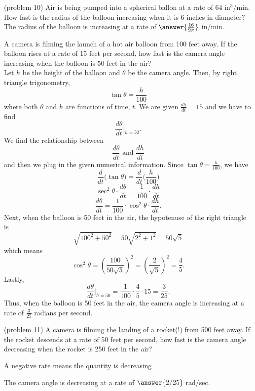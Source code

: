 \documentclass{ximera}
\begin{document}
\begin{problem}(problem 10)
Air is being pumped into a spherical ballon at a rate of 64 in$^3$/min. How fast is the radius of the balloon
increasing when it is 6 inches in diameter?\\


The radius of the balloon is increasing at a rate of $\answer{\frac{16}{9\pi}}$ in/min.
\end{problem}



\begin{example}[example 11]
A camera is filming the launch of a hot air balloon from 100 feet away. 
If the balloon rises at a rate of 15 feet per second, how fast is the camera angle increasing when the balloon is 50 feet in the air?\\
Let $h$ be the height of the balloon and $\theta$ be the camera angle. Then, by right triangle trigonometry, 
\[\tan \theta  = \frac{h}{100}\]
where both $\theta$ and $h$ are functions of time, $t$.
We are given $\frac{dh}{dt} = 15$ and we have to find
\[\frac{d\theta}{dt}\bigg|_{h = 50}.\]
We find the relationship between 
\[\frac{d\theta}{dt} \text{ and } \frac{dh}{dt}\]
and then we plug in the given numerical information.
Since $\tan\theta = \frac{h}{100}$, we have
\[\frac{d}{dt}\big(\tan\theta\big) = \frac{d}{dt} \Big(\frac{h}{100}\Big)\]
 \[\sec^2 \theta \cdot \frac{d\theta}{dt} = \frac{1}{100} \cdot \frac{dh}{dt}\]
\[ \frac{d\theta}{dt} = \frac{1}{100}\cdot\cos^2 \theta  \cdot\frac{dh}{dt}.\]
Next, when the balloon is 50 feet in the air, the hypotenuse of the right triangle is 
\[\sqrt{100^2 + 50^2} = 50\sqrt{2^2 + 1^2} = 50\sqrt 5\]
which means 
\[\cos^2 \theta = \left(\frac{100}{50\sqrt 5}\right)^2 = \left(\frac{2}{\sqrt 5}\right)^2 = \frac45.\]
Lastly,
\[\frac{d\theta}{dt}\bigg|_{h = 50}= \frac{1}{100} \cdot \frac45 \cdot 15 = \frac{3}{25}.\]
Thus, when the balloon is 50 feet in the air, the camera angle is increasing at a rate of $\frac{3}{25}$ radians per second.
\end{example}


\begin{problem}(problem 11)
A camera is filming the landing of a rocket(!) from 500 feet away. 
If the rocket descends at a rate of 50 feet per second, how fast is the camera angle decreasing when the 
rocket is 250 feet in the air?\\

\begin{hint} 
A negative rate means the quantity is decreasing
\end{hint}

The camera angle is decreasing at a rate of $\answer{2/25}$ rad/sec.

\end{problem}
\end{document}
